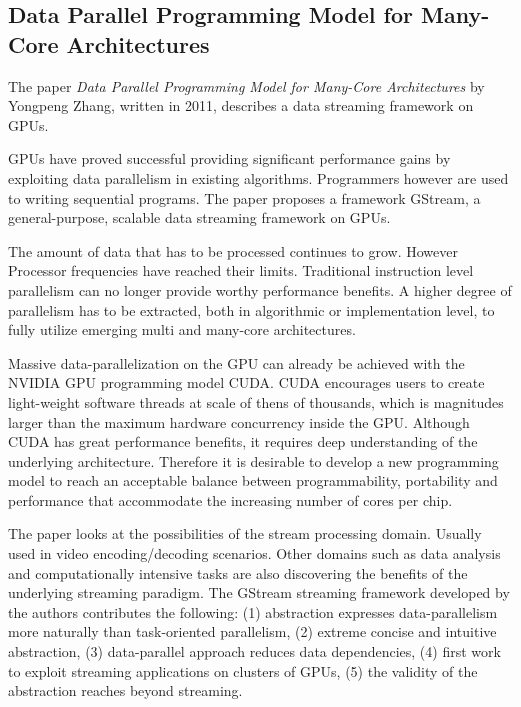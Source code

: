 \subsection{Data Parallel Programming Model for Many-Core Architectures}

The paper \emph{Data Parallel Programming Model for Many-Core Architectures}
\cite{ZhangDataParallelProgramming} by Yongpeng Zhang, written in 2011,
describes a data streaming framework on GPUs.

GPUs have proved successful providing significant performance gains by
exploiting data parallelism in existing algorithms. Programmers however are
used to writing sequential programs. The paper proposes a framework GStream,
a general-purpose, scalable data streaming framework on GPUs.

The amount of data that has to be processed continues to grow. However
Processor frequencies have reached their limits. Traditional instruction level
parallelism can no longer provide worthy performance benefits. A higher degree
of parallelism has to be extracted, both in algorithmic or implementation
level, to fully utilize emerging multi and many-core architectures.

Massive data-parallelization on the GPU can already be achieved with the NVIDIA
GPU programming model CUDA\@. CUDA encourages users to create light-weight
software threads at scale of thens of thousands, which is magnitudes larger
than the maximum hardware concurrency inside the GPU\@. Although CUDA has great
performance benefits, it requires deep understanding of the underlying
architecture. Therefore it is desirable to develop a new programming model to
reach an acceptable balance between programmability, portability and
performance that accommodate the increasing number of cores per chip.

The paper looks at the possibilities of the stream processing domain. Usually
used in video encoding/decoding scenarios. Other domains such as data analysis
and computationally intensive tasks are also discovering the benefits of the
underlying streaming paradigm. The GStream streaming framework developed by the
authors contributes the following: (1) abstraction expresses data-parallelism
more naturally than task-oriented parallelism, (2) extreme concise and
intuitive abstraction, (3) data-parallel approach reduces data dependencies,
(4) first work to exploit streaming applications on clusters of GPUs, (5) the
validity of the abstraction reaches beyond streaming.

